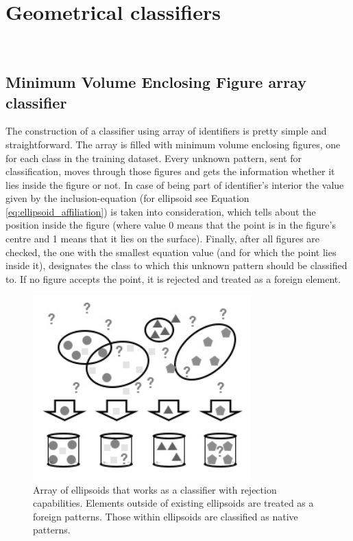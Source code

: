 \section{Geometrical classifiers} \ \label{geometrical_classifiers}

\subsection{Minimum Volume Enclosing Figure array classifier}

The construction of a classifier using array of identifiers is pretty simple and straightforward. The array is filled with minimum volume enclosing figures, one for each class in the training dataset. Every unknown pattern, sent for classification, moves through those figures and gets the information whether it lies inside the figure or not. In case of being part of identifier's interior the value given by the inclusion-equation (for ellipsoid see Equation \ref{eq:ellipsoid_affiliation}) is taken into consideration, which tells about the position inside the figure (where value 0 means that the point is in the figure's centre and 1 means that it lies on the surface). Finally, after all figures are checked, the one with the smallest equation value (and for which the point lies inside it), designates the class to which this unknown pattern should be classified to. If no figure accepts the point, it is rejected and treated as a foreign element. 

\begin{figure}[htp]
	\centering
	\includegraphics[width=0.75\textwidth]{Figures/ellipsoid_classification.jpg}
	\caption{ Array of ellipsoids that works as a classifier with rejection capabilities. Elements outside of existing ellipsoids are treated as a foreign patterns. Those within ellipsoids are classified as native patterns. }
	\label{fig:ellipsoids_array}\vspace{-3pt}
\end{figure}

